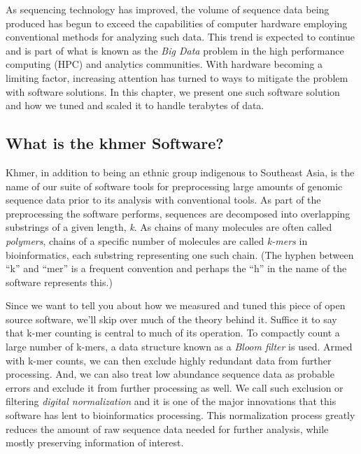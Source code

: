 \documentclass{article}
\begin{document}

As sequencing technology has improved, the volume of sequence data being produced has begun to exceed the capabilities of computer hardware employing conventional methods for analyzing such data. This trend is expected to continue and is part of what is known as the \textit{Big Data} problem in the high performance computing (HPC) and analytics communities. With hardware becoming a limiting factor, increasing attention has turned to ways to mitigate the problem with software solutions. In this chapter, we present one such software solution and how we tuned and scaled it to handle terabytes of data.

\subsection{What is the khmer Software?}

Khmer, in addition to being an ethnic group indigenous to Southeast Asia, is the name of our suite of software tools \citep{web:khmer} for preprocessing large amounts of genomic sequence data prior to its analysis with conventional tools. As part of the preprocessing the software performs, sequences are decomposed into overlapping substrings of a given length, \textit{k}. As chains of many molecules are often called \textit{polymers}, chains of a specific number of molecules are called \textit{k-mers} in bioinformatics, each substring representing one such chain. (The hyphen between ``k'' and ``mer'' is a frequent convention and perhaps the ``h'' in the name of the software represents this.)



Since we want to tell you about how we measured and tuned this piece of open source software, we'll skip over much of the theory behind it. Suffice it to say that k-mer counting is central to much of its operation. To compactly count a large number of k-mers, a data structure known as a \textit{Bloom filter} is used. Armed with k-mer counts, we can then exclude highly redundant data from further processing. And, we can also treat low abundance sequence data as probable errors and exclude it from further processing as well. We call such exclusion or filtering \textit{digital normalization} and it is one of the major innovations that this software has lent to bioinformatics processing. This normalization process greatly reduces the amount of raw sequence data needed for further analysis, while mostly preserving information of interest.
\end{document}
